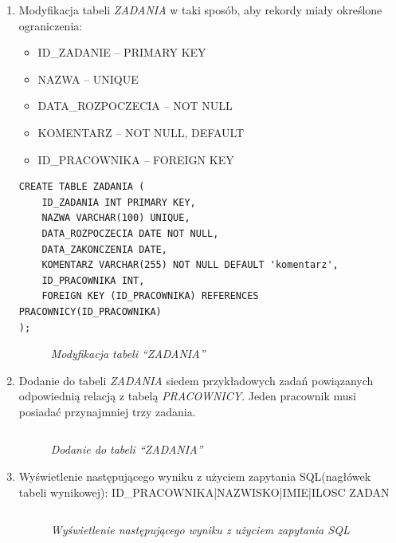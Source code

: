 \documentclass{article}
\begin{document}
\begin{enumerate}
\item Modyfikacja tabeli \emph{ZADANIA} w taki sposób, aby rekordy miały określone ograniczenia:
\begin{itemize}
\item ID\_ZADANIE -- PRIMARY KEY
\item NAZWA -- UNIQUE
\item DATA\_ROZPOCZECIA -- NOT NULL
\item KOMENTARZ -- NOT NULL, DEFAULT
\item ID\_PRACOWNIKA -- FOREIGN KEY
\end{itemize}

\begin{lstlisting}[style=SQL, caption=\textit{Modyfikacja tabeli ``ZADANIA''}]
CREATE TABLE ZADANIA (
    ID_ZADANIA INT PRIMARY KEY,
    NAZWA VARCHAR(100) UNIQUE,
    DATA_ROZPOCZECIA DATE NOT NULL,
    DATA_ZAKONCZENIA DATE,
    KOMENTARZ VARCHAR(255) NOT NULL DEFAULT 'komentarz',
    ID_PRACOWNIKA INT,
    FOREIGN KEY (ID_PRACOWNIKA) REFERENCES PRACOWNICY(ID_PRACOWNIKA)
);
\end{lstlisting}

\begin{figure}[H]
	\centering
	\caption{\textit{Modyfikacja tabeli ``ZADANIA''}}
\end{figure}

\item Dodanie do tabeli \emph{ZADANIA} siedem przykładowych zadań powiązanych odpowiednią relacją z tabelą \emph{PRACOWNICY}. Jeden pracownik musi posiadać przynajmniej trzy zadania.

\begin{lstlisting}[style=SQL, caption=\textit{Dodanie do tabeli ``ZADANIA''}]
\end{lstlisting}

\begin{figure}[H]
	\centering
	\caption{\textit{Dodanie do tabeli ``ZADANIA''}}
\end{figure}

\item Wyświetlenie następującego wyniku z użyciem zapytania SQL(nagłówek tabeli wynikowej): ID\_PRACOWNIKA|NAZWISKO|IMIE|ILOSC ZADAN

\begin{lstlisting}[style=SQL, caption=\textit{Wyświetlenie następującego wyniku z użyciem zapytania SQL}]
\end{lstlisting}

\begin{figure}[H]
	\centering
	\caption{\textit{Wyświetlenie następującego wyniku z użyciem zapytania SQL}}
\end{figure}


\end{enumerate}
\end{document}
